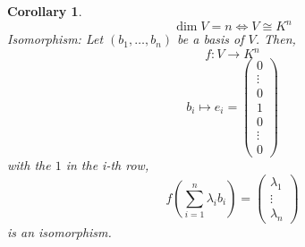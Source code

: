 \documentclass[a4paper,landscape,twocolumn]{article}
\newtheorem{cor}{Corollary}
\begin{document}
\begin{cor}
  \[ \dim{V} = n \Leftrightarrow V \cong K^n \]
  Isomorphism: Let $(b_1, \dots, b_n)$ be a basis of $V$.
  Then,
  \[ f: V \rightarrow K^n \]
  \[ b_i \mapsto e_i = \begin{pmatrix} 0 \\ \vdots \\ 0 \\ 1 \\ 0 \\ \vdots \\ 0 \end{pmatrix} \]
  with the $1$ in the i-th row,
  \[
    f\left(\sum_{i=1}^n \lambda_i b_i\right)
    = \begin{pmatrix} \lambda_1 \\ \vdots \\ \lambda_n \end{pmatrix}
  \]
  is an isomorphism.
\end{cor}
\end{document}
